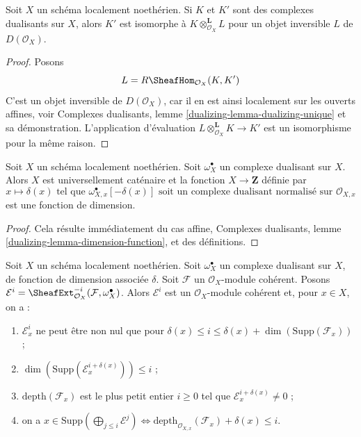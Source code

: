 \begin{lemma}
\label{lemma-dualizing-unique-schemes}
Soit $X$ un schéma localement noethérien. Si $K$ et $K'$ sont des complexes dualisants sur $X$, alors $K'$ est isomorphe à $K \otimes_{\mathcal{O}_X}^\mathbf{L} L$ pour un objet inversible $L$ de $D(\mathcal{O}_X)$.
\end{lemma}

\begin{proof}
Posons
$$
L = R\SheafHom_{\mathcal{O}_X}(K, K')
$$
C'est un objet inversible de $D(\mathcal{O}_X)$, car il en est ainsi localement sur les ouverts affines, voir Complexes dualisants, lemme \ref{dualizing-lemma-dualizing-unique} et sa démonstration. L'application d'évaluation $L \otimes_{\mathcal{O}_X}^\mathbf{L} K \to K'$ est un isomorphisme pour la même raison.
\end{proof}

\begin{lemma}
\label{lemma-dimension-function-scheme}
Soit $X$ un schéma localement noethérien. Soit $\omega_X^\bullet$ un complexe dualisant sur $X$. Alors $X$ est universellement caténaire et la fonction $X \to \mathbf{Z}$ définie par
$$
x \longmapsto \delta(x)\text{ tel que }
\omega_{X, x}^\bullet[-\delta(x)]
\text{ soit un complexe dualisant normalisé sur }
\mathcal{O}_{X, x}
$$
est une fonction de dimension.
\end{lemma}

\begin{proof}
Cela résulte immédiatement du cas affine, Complexes dualisants, lemme \ref{dualizing-lemma-dimension-function}, et des définitions.
\end{proof}

\begin{lemma}
\label{lemma-sitting-in-degrees}
Soit $X$ un schéma localement noethérien. Soit $\omega_X^\bullet$ un complexe dualisant sur $X$, de fonction de dimension associée $\delta$. Soit $\mathcal{F}$ un $\mathcal{O}_X$-module cohérent. Posons $\mathcal{E}^i = \SheafExt^{-i}_{\mathcal{O}_X}(\mathcal{F}, \omega_X^\bullet)$. Alors $\mathcal{E}^i$ est un $\mathcal{O}_X$-module cohérent et, pour $x \in X$, on a :
\begin{enumerate}
\item $\mathcal{E}^i_x$ ne peut être non nul que pour $\delta(x) \leq i \leq \delta(x) + \dim(\text{Supp}(\mathcal{F}_x))$ ;
\item $\dim(\text{Supp}(\mathcal{E}^{i + \delta(x)}_x)) \leq i$ ;
\item $\text{depth}(\mathcal{F}_x)$ est le plus petit entier $i \geq 0$ tel que $\mathcal{E}_x^{i + \delta(x)} \not = 0$ ;
\item on a $x \in \text{Supp}(\bigoplus_{j \leq i} \mathcal{E}^j)
\Leftrightarrow
\text{depth}_{\mathcal{O}_{X, x}}(\mathcal{F}_x) + \delta(x) \leq i$.
\end{enumerate}
\end{lemma}

